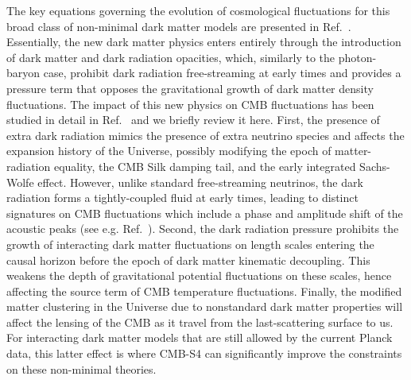 The key equations governing the evolution of cosmological fluctuations for this broad class of non-minimal dark matter models are presented in Ref.~\cite{Cyr-Racine:2015ihg}. Essentially, the new dark matter physics enters entirely through the introduction of dark matter and dark radiation opacities, which, similarly to the photon-baryon case, prohibit dark radiation free-streaming at early times and provides a pressure term that opposes the gravitational growth of dark matter density fluctuations. The impact of this new physics on CMB fluctuations has been studied in detail in Ref.~\cite{Cyr-Racine:2013fsa} and we briefly review it here. First, the presence of extra dark radiation mimics the presence of extra neutrino species and affects the expansion history of the Universe, possibly modifying the epoch of matter-radiation equality, the CMB Silk damping tail, and the early integrated Sachs-Wolfe effect. However, unlike standard free-streaming neutrinos, the dark radiation forms a tightly-coupled fluid at early times, leading to distinct signatures on CMB fluctuations which include a phase and amplitude shift of the acoustic peaks (see e.g. Ref.~\cite{Bashinsky:2003tk,Cyr-Racine:2013jua,Follin:2015hya}). Second, the dark radiation pressure prohibits the growth of interacting dark matter fluctuations on length scales entering the causal horizon before the epoch of dark matter kinematic decoupling. This weakens the depth of gravitational potential fluctuations on these scales, hence affecting the source term of CMB temperature fluctuations. Finally, the modified matter clustering in the Universe due to nonstandard dark matter properties will affect the lensing of the CMB as it travel from the last-scattering surface to us. For interacting dark matter models that are still allowed by the current Planck data, this latter effect is where CMB-S4 can significantly improve the constraints on these non-minimal theories.

